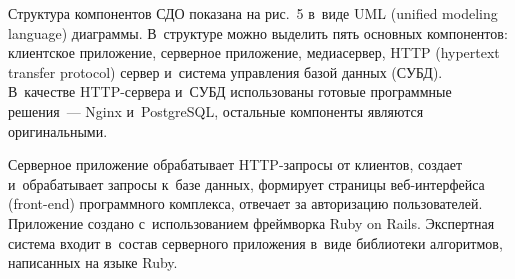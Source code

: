 \begin{multicols}{2}
  Структура компонентов СДО показана на рис.~5 в~виде UML
  (unified modeling language) диа\-грам\-мы. 
В~структуре можно выделить пять основных компонентов: клиентское 
приложение, серверное приложение, медиасервер, HTTP (hypertext transfer protocol)
сер\-вер и~система 
управления базой данных (СУБД). В~качестве HTTP-сер\-ве\-ра и~СУБД 
использованы готовые программные решения~--- \mbox{Nginx} и~\mbox{PostgreSQL}, 
остальные компоненты являются оригинальными. 
  
 
  Серверное приложение обрабатывает HTTP-за\-про\-сы от клиентов, создает 
и~обрабатывает запросы к~базе данных, формирует страницы веб-ин\-тер\-фей\-са 
(front-end) программного комплекса, отвечает за авторизацию пользователей. 
Приложение создано с~использованием фреймворка Ruby on Rails. Экспертная 
система входит в~состав серверного приложения в~виде библиотеки алгоритмов, 
написанных на языке Ruby.

\begin{table*}[b]\small %
  \begin{center}
  \vspace*{2ex}
  

\end{center}
\end{table*}
\end{multicols}
